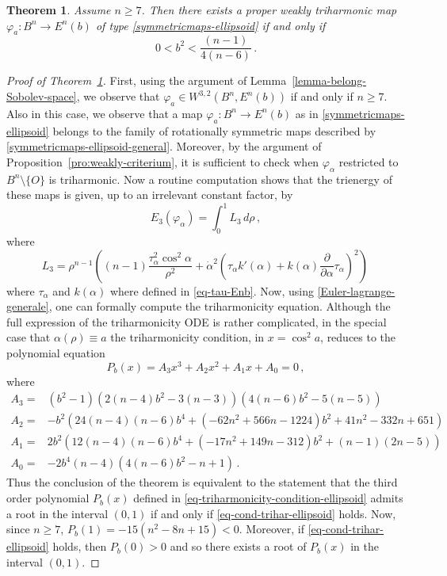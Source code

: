 \documentclass[10pt,a4paper]{amsart}
\newtheorem{theorem}{Theorem}
\begin{document}
\begin{theorem}\label{th-ellipsoid-triharm}
Assume  $n\geq 7$.  Then there exists a proper weakly triharmonic map $\varphi_a:B^n \to E^n(b)$ of type \eqref{symmetricmaps-ellipsoid} if and only if
\begin{equation}\label{eq-cond-trihar-ellipsoid}
0<b^2<\frac{(n-1)}{4(n-6)}\,.
\end{equation} 
\end{theorem}

\begin{proof}[Proof of Theorem~\ref{th-ellipsoid-triharm}]
First, using the argument of Lemma~\ref{lemma-belong-Sobolev-space}, we observe that $\varphi_a \in  W^{3,2}\left ( B^n,E^n(b) \right )$ if and only if $n \geq 7$.
Also in this case, we observe that a map $\varphi_a:B^n \to E^n(b)$ as in \eqref{symmetricmaps-ellipsoid} belongs to the family of rotationally symmetric maps described by \eqref{symmetricmaps-ellipsoid-general}. Moreover, by the argument of Proposition~\ref{pro:weakly-criterium}, it is sufficient to check when $\varphi_{\alpha}$ restricted to $B^n\setminus\{O\}$ is triharmonic. Now a routine computation shows that the trienergy of these maps is given, up to an irrelevant constant factor, by
\begin{equation}\label{eq-bienergy-ellipsoid}
E_3\left( \varphi_\alpha \right )=\int_0^1 L_3\,d\rho \,,
\end{equation}
where
\[
L_3= \rho^{n-1} \left((n-1) \frac{\tau^2_{\alpha}  \cos^2 \alpha}{\rho^2}+ {\dot\alpha}^2\left(\tau_{\alpha}k'(\alpha)+k(\alpha) \frac{\partial}{\partial\alpha}{{\tau}_{\alpha}}\right)^2\right)\,
\]
where $\tau_\alpha$ and $k(\alpha)$ where defined in \eqref{eq-tau-Enb}. Now, using \eqref{Euler-lagrange-generale}, one can formally compute the triharmonicity equation. Although the full expression of the triharmonicity ODE is rather complicated, in the special case that $\alpha(\rho)\equiv a$ the triharmonicity condition, in $x=\cos^2 a$, reduces to the polynomial equation
\begin{equation}\label{eq-triharmonicity-condition-ellipsoid}
P_{b}(x)=A_3 x^3+A_2 x^2+A_1 x+A_0=0 \,,
\end{equation}
where
{\small
\[
\begin{split}
A_3=&(b^2-1)  \left(2(n-4) b^2-3 (n-3)\right) \left(4 (n-6) b^2-5 (n-5)\right)\\
A_2=&-b^2 \left(24 (n-4) (n-6)b^4 + (-62 n^2+566 n-1224)b^2+41 n^2-332 n+651\right)\\
A_1=&2 b^2 \left(12 (n-4) (n-6) b^4+(-17 n^2+149 n-312)b^2+(n-1) (2 n-5)\right)\\
A_0=&-2 b^4 (n-4) \left(4(n-6) b^2-n+1\right)\,.
\end{split}
\]
}
Thus the conclusion of the theorem is equivalent to the statement that the third order polynomial $P_b(x)$ defined in \eqref{eq-triharmonicity-condition-ellipsoid} admits a root in the interval $(0,1)$  if and only if \eqref{eq-cond-trihar-ellipsoid} holds. Now, since $n \geq 7$, $P_b(1)=-15 \left(n^2-8 n+15\right)<0$. Moreover, if \eqref{eq-cond-trihar-ellipsoid} holds, then $P_b(0)>0$ and so there exists a root of $P_b(x)$
in the interval $(0,1)$.


\end{proof}
\end{document}
